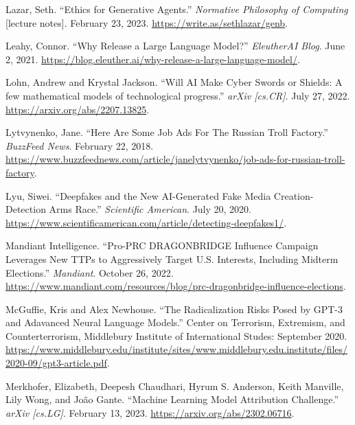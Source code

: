 \documentclass{article}
\begin{document}
\begin{thebibliography}{9}
  Lazar, Seth. ``Ethics for Generative Agents.'' \textit{Normative Philosophy of Computing} [lecture notes]. February 23, 2023. \href{https://write.as/sethlazar/genb}{https://write.as/sethlazar/genb}. 

  Leahy, Connor. ``Why Release a Large Language Model?'' \textit{EleutherAI Blog}. June 2, 2021. \href{https://blog.eleuther.ai/why-release-a-large-language-model/}{https://blog.eleuther.ai/why-release-a-large-language-model/}.

  Lohn, Andrew and Krystal Jackson. ``Will AI Make Cyber Swords or Shields: A few mathematical models of technological progress.'' \textit{arXiv [cs.CR]}. July 27, 2022. \href{https://arxiv.org/abs/2207.13825}{https://arxiv.org/abs/2207.13825}. 

  Lytvynenko, Jane. ``Here Are Some Job Ads For The Russian Troll Factory.'' \textit{BuzzFeed News}. February 22, 2018. \href{https://www.buzzfeednews.com/article/janelytvynenko/job-ads-for-russian-troll-factory}{https://www.buzzfeednews.com/article/janelytvynenko/job-ads-for-russian-troll-factory}.

  Lyu, Siwei. ``Deepfakes and the New AI-Generated Fake Media Creation-Detection Arms Race.'' \textit{Scientific American}. July 20, 2020. \href{https://www.scientificamerican.com/article/detecting-deepfakes1/}{https://www.scientificamerican.com/article/detecting-deepfakes1/}.

  Mandiant Intelligence. ``Pro-PRC DRAGONBRIDGE Influence Campaign Leverages New TTPs to Aggressively Target U.S. Interests, Including Midterm Elections.'' \textit{Mandiant}. October 26, 2022. \href{https://www.mandiant.com/resources/blog/prc-dragonbridge-influence-elections}{https://www.mandiant.com/resources/blog/prc-dragonbridge-influence-elections}.

  McGuffie, Kris and Alex Newhouse. ``The Radicalization Risks Posed by GPT-3 and Adavanced Neural Language Models.'' Center on Terrorism, Extremism, and Counterterrorism, Middlebury Institute of International Studes: September 2020. \href{https://www.middlebury.edu/institute/sites/www.middlebury.edu.institute/files/2020-09/gpt3-article.pdf}{https://www.middlebury.edu/institute/sites/www.middlebury.edu.institute/files/2020-09/gpt3-article.pdf}.

  Merkhofer, Elizabeth, Deepesh Chaudhari, Hyrum S. Anderson, Keith Manville, Lily Wong, and João Gante. ``Machine Learning Model Attribution Challenge.'' \textit{arXiv [cs.LG]}. February 13, 2023. \href{https://arxiv.org/abs/2302.06716}{https://arxiv.org/abs/2302.06716}. 


\end{thebibliography}
\end{document}
